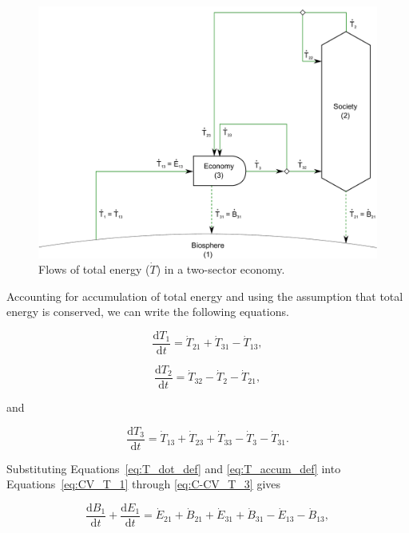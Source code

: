 \begin{figure}[h!]
\includegraphics[width=0.9\linewidth]{Part_2/Chapter_Embodied/images/2_sector_embodied_energy.pdf}
\caption{Flows of total energy ($\dot{T}$) in a two-sector economy.}
\label{fig:B_total_energy}
\end{figure}

Accounting for accumulation of total energy and using the assumption 
that total energy is conserved, we can write the following equations.

\begin{equation} \label{eq:CV_T_1}
	\frac{\mathrm{d}T_{1}}{\mathrm{d}t} 	 
	= \dot{T}_{21} 
	+ \dot{T}_{31} 
	- \dot{T}_{13},
\end{equation}

\begin{equation} \label{eq:CV_T_2}
	\frac{\mathrm{d}T_{2}}{\mathrm{d}t} 	 
	= \dot{T}_{32} 
	- \dot{T}_2
	- \dot{T}_{21},
\end{equation}

\noindent and

\begin{equation} \label{eq:CV_T_3}
	\frac{\mathrm{d}T_{3}}{\mathrm{d}t} 	 
	= \dot{T}_{13} 
	+ \dot{T}_{23}
	+ \dot{T}_{33} 
	- \dot{T}_{3} 
	- \dot{T}_{31}.
\end{equation}

Substituting Equations~\ref{eq:T_dot_def} 
and \ref{eq:T_accum_def} into 
Equations~\ref{eq:CV_T_1} through
\ref{eq:C-CV_T_3} gives

\begin{equation} \label{eq:CV_dB_1}
	\frac{\mathrm{d}B_{1}}{\mathrm{d}t} 
	+ \frac{\mathrm{d}E_{1}}{\mathrm{d}t} 
	= \dot{E}_{21} 
	+ \dot{B}_{21} 
	+ \dot{E}_{31} 
	+ \dot{B}_{31} 
	- \dot{E}_{13} 
	- \dot{B}_{13},
\end{equation}

